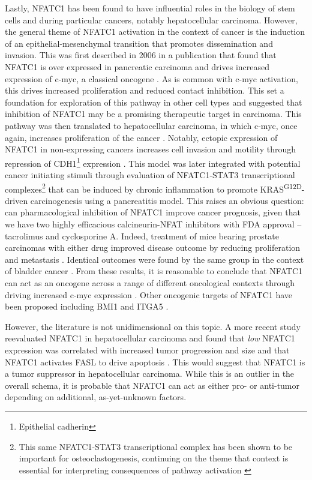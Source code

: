 Lastly, NFATC1 has been found to have influential roles in the biology of stem cells and during particular cancers, notably hepatocellular carcinoma. However, the general theme of NFATC1 activation in the context of cancer is the induction of an epithelial-mesenchymal transition that promotes dissemination and invasion. This was first described in 2006 in a publication that found that NFATC1 is over expressed in pancreatic carcinoma and drives increased expression of c-myc, a classical oncogene \citep{Buchholz2006, Eerola2019}. As is common with c-myc activation, this drives increased proliferation and reduced contact inhibition. This set a foundation for exploration of this pathway in other cell types and suggested that inhibition of NFATC1 may be a promising therapeutic target in carcinoma. This pathway was then translated to hepatocellular carcinoma, in which c-myc, once again, increases proliferation of the cancer \citep{Wang2012}. Notably, ectopic expression of NFATC1 in non-expressing cancers increases cell invasion and motility through repression of CDH1\footnote{Epithelial cadherin} expression \citep{Oikawa2013}. This model was later integrated with potential cancer initiating stimuli through evaluation of NFATC1-STAT3 transcriptional complexes\footnote{This same NFATC1-STAT3 transcriptional complex has been shown to be important for osteoclastogenesis, continuing on the theme that context is essential for interpreting consequences of pathway activation \citep{Baumgart2014}} that can be induced by chronic inflammation to promote KRAS\textsuperscript{G12D}-driven carcinogenesis using a pancreatitis model. This raises an obvious question: can pharmacological inhibition of NFATC1 improve cancer prognosis, given that we have two highly efficacious calcineurin-NFAT inhibitors with FDA approval -- tacrolimus and cyclosporine A. Indeed, treatment of mice bearing prostate carcinomas with either drug improved disease outcome by reducing proliferation and metastasis \citep{Kawahara2015a}. Identical outcomes were found by the same group in the context of bladder cancer \citep{Kawahara2015b}. From these results, it is reasonable to conclude that NFATC1 can act as an oncogene across a range of different oncological contexts through driving increased c-myc expression \citep{Buchholz2006, Flockhart2009, Seifert2009, Oikawa2013, Kawahara2015a, Kawahara2015b, Liu2021}. Other oncogenic targets of NFATC1 have been proposed including BMI1 \citep{Wu2019} and ITGA5 \citep{Eerola2019}. 

However, the literature is not unidimensional on this topic. A more recent study reevaluated NFATC1 in hepatocellular carcinoma and found that \textit{low} NFATC1 expression was correlated with increased tumor progression and size and that NFATC1 activates FASL to drive apoptosis \citep{Xu2018}. This would suggest that NFATC1 is a tumor suppressor in hepatocellular carcinoma. While this is an outlier in the overall schema, it is probable that NFATC1 can act as either pro- or anti-tumor depending on additional, as-yet-unknown factors. 

